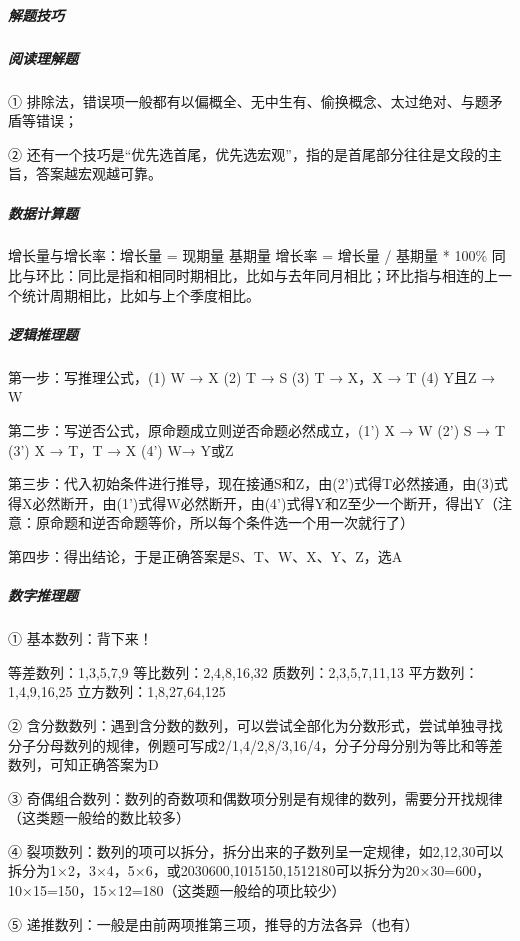 \documentclass[letterpaper,10pt,english]{sphinxmanual}
\begin{document}
\subparagraph{解题技巧}
\label{\detokenize{chapter_interview/exam:id3}}

\subparagraph{阅读理解题}
\label{\detokenize{chapter_interview/exam:id4}}
①
排除法，错误项一般都有以偏概全、无中生有、偷换概念、太过绝对、与题矛盾等错误；

②
还有一个技巧是“优先选首尾，优先选宏观”，指的是首尾部分往往是文段的主旨，答案越宏观越可靠。


\subparagraph{数据计算题}
\label{\detokenize{chapter_interview/exam:id5}}
增长量与增长率：增长量 = 现期量 \sphinxhyphen{} 基期量 增长率 = 增长量 / 基期量 *
100\%
同比与环比：同比是指和相同时期相比，比如与去年同月相比；环比指与相连的上一个统计周期相比，比如与上个季度相比。


\subparagraph{逻辑推理题}
\label{\detokenize{chapter_interview/exam:id6}}
第一步：写推理公式，(1) W → X (2) \sphinxhyphen{}T → \sphinxhyphen{}S (3) T → \sphinxhyphen{}X，X → \sphinxhyphen{}T (4) Y且Z →
W

第二步：写逆否公式，原命题成立则逆否命题必然成立，(1’) \sphinxhyphen{}X → \sphinxhyphen{}W (2’) S →
T (3’) X → \sphinxhyphen{}T，T → \sphinxhyphen{}X (4’) \sphinxhyphen{}W→ \sphinxhyphen{}Y或\sphinxhyphen{}Z

第三步：代入初始条件进行推导，现在接通S和Z，由(2’)式得T必然接通，由(3)式得X必然断开，由(1’)式得W必然断开，由(4’)式得Y和Z至少一个断开，得出\sphinxhyphen{}Y（注意：原命题和逆否命题等价，所以每个条件选一个用一次就行了）

第四步：得出结论，于是正确答案是S、T、\sphinxhyphen{}W、\sphinxhyphen{}X、\sphinxhyphen{}Y、Z，选A


\subparagraph{数字推理题}
\label{\detokenize{chapter_interview/exam:id7}}
① 基本数列：背下来！

等差数列：1,3,5,7,9 等比数列：2,4,8,16,32 质数列：2,3,5,7,11,13
平方数列：1,4,9,16,25 立方数列：1,8,27,64,125

②
含分数数列：遇到含分数的数列，可以尝试全部化为分数形式，尝试单独寻找分子分母数列的规律，例题可写成2/1,4/2,8/3,16/4，分子分母分别为等比和等差数列，可知正确答案为D

③
奇偶组合数列：数列的奇数项和偶数项分别是有规律的数列，需要分开找规律（这类题一般给的数比较多）

④
裂项数列：数列的项可以拆分，拆分出来的子数列呈一定规律，如2,12,30可以拆分为1×2，3×4，5×6，或2030600,1015150,1512180可以拆分为20×30=600，10×15=150，15×12=180（这类题一般给的项比较少）

⑤
递推数列：一般是由前两项推第三项，推导的方法各异（也有）
\end{document}
